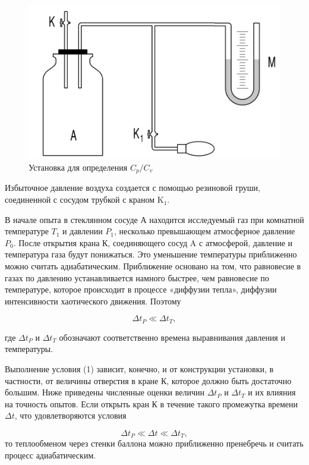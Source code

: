 \documentclass[a4paper,12pt]{article} %
\begin{document}
	\begin{figure}[h!]
		\centering
		\includegraphics[scale = 0.4]{Установка.png}
		\caption{Установка для определения $C_{p}/C_{v}$}
	\end{figure}

	
Избыточное давление воздуха создается с помощью резиновой груши, соединенной с сосудом трубкой с краном $\text{K}_{1}$.
	

В начале опыта в стеклянном сосуде А находится исследуемый газ при комнатной температуре $T_{1}$ и давлении $P_{1}$, несколько превышающем атмосферное давление $P_{0}$. После открытия крана К, соединяющего сосуд A с атмосферой, давление и температура газа будут понижаться. Это уменьшение температуры приближенно можно считать адиабатическим. Приближение основано на том, что равновесие в газах по давлению устанавливается намного быстрее, чем равновесие по температуре, которое происходит в процессе «диффузии тепла», диффузии интенсивности хаотического движения. Поэтому
	
	\begin{equation}
		\Delta t_{P} \ll \Delta t_{T},
	\end{equation}

\noindent	где $\Delta t_{P}$ и $\Delta t_{T}$ обозначают соответственно времена выравнивания давления и температуры.

	
 Выполнение условия (1) зависит, конечно, и от конструкции установки, в частности, от величины отверстия в кране К, которое должно быть достаточно большим. Ниже приведены численные оценки величин $\Delta t_{P}$ и $\Delta t_{T}$ и их влияния на точность опытов. Если открыть	кран К в течение такого промежутка времени $\Delta t$, что удовлетворяются условия
	
	\begin{equation}
		\Delta t_{P} \ll \Delta t \ll \Delta t_{T},
	\end{equation}
\noindent то теплообменом через стенки баллона можно приближенно пренебречь и считать процесс адиабатическим.
\end{document}
